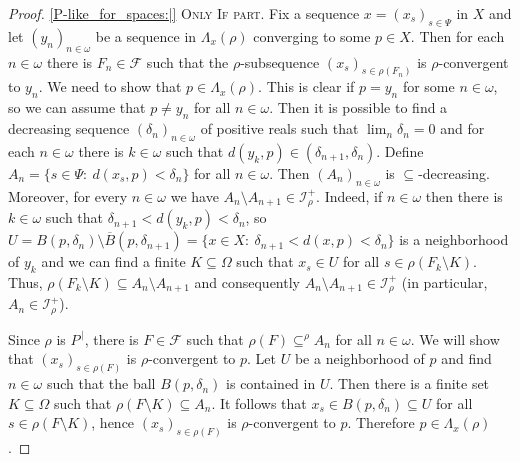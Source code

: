 \documentclass{amsart}
\theoremstyle{plain}
\theoremstyle{definition}
\theoremstyle{remark}
\newcommand{\cF}{\mathcal{F}}
\newcommand{\cI}{\mathcal{I}}
\newcommand{\I}{\cI}
\begin{document}
\begin{proof}
\ref{P-like_for_spaces:|} 
\textsc{Only If part.} Fix a sequence $x=(x_s)_{s\in\Psi}$ in $X$ and let $(y_n)_{n\in\omega}$ be a sequence in $\Lambda_x(\rho)$ converging to some $p\in X$. Then for each $n\in\omega$ there is $F_n\in\cF$ such that the $\rho$-subsequence $(x_s)_{s\in\rho(F_n)}$ is $\rho$-convergent to $y_n$. We need to show that $p\in\Lambda_x(\rho)$. This is clear if $p=y_n$ for some $n\in\omega$, so we can assume that $p\neq y_n$ for all $n\in\omega$. Then it is possible to find a decreasing sequence $(\delta_n)_{n\in\omega}$ of positive reals such that $\lim_{n}\delta_n=0$ and for each $n\in\omega$ there is $k\in\omega$ such that $d(y_k,p)\in (\delta_{n+1},\delta_n)$. Define $A_n=\{s\in \Psi:\ d(x_s,p)<\delta_n\}$ for all $n\in\omega$. Then $(A_n)_{n\in\omega}$ is $\subseteq$-decreasing. Moreover, for every $n\in\omega$ we have $A_n\setminus A_{n+1}\in\I^+_\rho$. Indeed, if $n\in\omega$ then there is $k\in\omega$ such that $\delta_{n+1}<d(y_k,p)<\delta_n$, so $U=B(p,\delta_n)\setminus\overline{B}(p,\delta_{n+1})=\{x\in X:\ \delta_{n+1}<d(x,p)<\delta_n\}$ is a neighborhood of $y_k$ and we can find a finite $K\subseteq\Omega$ such that $x_s\in U$ for all $s\in\rho(F_k\setminus K)$. Thus, $\rho(F_k\setminus K)\subseteq A_n\setminus A_{n+1}$ and consequently $A_n\setminus A_{n+1}\in\I^+_\rho$ (in particular, $A_n\in\I^+_\rho$).

Since $\rho$ is $P^{\,|}$, there is $F\in\cF$ such that $\rho(F)\subseteq^\rho A_n$ for all $n\in\omega$. We will show that $(x_s)_{s\in\rho(F)}$ is $\rho$-convergent to $p$. Let $U$ be a neighborhood of $p$ and find $n\in\omega$ such that the ball $B(p,\delta_n)$ is contained in $U$. Then there is a finite set $K\subseteq\Omega$ such that $\rho(F\setminus K)\subseteq A_n$. It follows that $x_s\in B(p,\delta_n)\subseteq U$ for all $s\in \rho(F\setminus K)$, hence $(x_s)_{s\in\rho(F)}$ is $\rho$-convergent to $p$. Therefore $p \in \Lambda_x(\rho)$. 



\end{proof}
\end{document}
